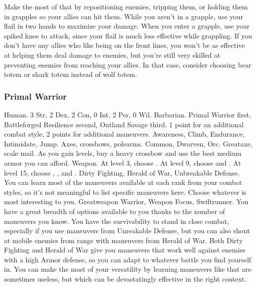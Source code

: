             Make the most of that by repositioning enemies, tripping them, or holding them in grapples so your allies can hit them.
            While you aren't in a grapple, use your flail in two hands to maximize your damage.
            When you enter a grapple, use your spiked knee to attack, since your flail is much less effective while grappling.
            If you don't have any allies who like being on the front lines, you won't be as effective at helping them deal damage to enemies, but you're still very skilled at preventing enemies from reaching your allies.
            In that case, consider choosing bear totem or shark totem instead of wolf totem.

        \subsubsection{Primal Warrior}
             Human.
             3 Str, 2 Dex, 2 Con, 0 Int, 2 Per, 0 Wil.
             Barbarian.
             Primal Warrior first, Battleforged Resilience second, Outland Savage third.
             1 point for an additional combat style, 2 points for additional maneuvers.
             Awareness, Climb, Endurance, Intimidate, Jump.
             Axes, crossbows, polearms.
             Common, Dwarven, Orc.
             Greataxe, scale mail. As you gain levels, buy a heavy crossbow and use the best medium armor you can afford.
             Weapon.
                At level 3, choose .
                At level 9, choose  and .
                At level 15, choose , , and .
             Dirty Fighting, Herald of War, Unbreakable Defense.
             You can learn most of the maneuvers available at each rank from your combat styles, so it's not meaningful to list specific maneuvers here.
            Choose whatever is most interesting to you.
             Greatweapon Warrior, Weapon Focus, Swiftrunner.
             You have a great breadth of options available to you thanks to the number of maneuvers you know.
            You have the survivability to stand in close combat, especially if you use maneuvers from Unreakable Defense, but you can also shout at mobile enemies from range with maneuvers from Herald of War.
            Both Dirty Fighting and Herald of War give you maneuvers that work well against enemies with a high Armor defense, so you can adapt to whatever battle you find yourself in.
            You can make the most of your versatility by learning maneuvers like  that are sometimes useless, but which can be devastatingly effective in the right context.

